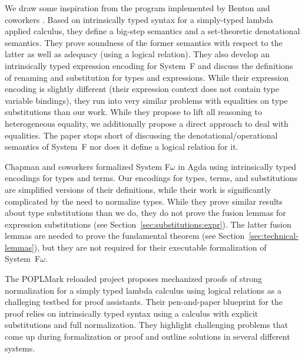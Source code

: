 \documentclass[acmsmall,anonymous,review,screen]{acmart}
\begin{document}
We draw some inspiration from the program implemented by Benton and coworkers
\cite{DBLP:journals/jar/BentonHKM12}. Based on intrinsically typed
syntax for a simply-typed lambda applied calculus, they define a
big-step semantics and a set-theoretic denotational semantics. They
prove soundness of the former semantics with respect to the latter as
well as adequacy (using a logical relation). They also develop an
intrinsically typed expression encoding for System~F and discuss the
definitions of renaming and substitution for types and expressions.
While their expression encoding is slightly different (their
expression context does not contain type variable bindings), they run
into very similar problems with equalities on type substitutions than
our work. While they propose to lift all reasoning to heterogeneous
equality, we additionally propose a direct approach to deal with
equalities. 
The paper stops short of discussing the denotational/operational
semantics of System~F nor does it define a logical relation for it.

Chapman and coworkers \cite{DBLP:conf/mpc/ChapmanKNW19} formalized
System F$\omega$ in Agda using intrinsically typed encodings for types
and terms. Our encodings for types, terms, and substitutions are
simplified versions of their definitions, while their work is
significantly complicated by the need to normalize types. While they
prove similar results about type substitutions than we do, they do not
prove the fusion lemmas for expression substitutions (see
Section~\ref{sec:substitutions:expr}). The latter fusion lemmas are needed to
prove the fundamental theorem (see
Section~\ref{sec:technical-lemmas}), but they are not required for
their executable formalization of System~F$\omega$.

The POPLMark reloaded project \cite{DBLP:journals/jfp/AbelAHPMSS19} proposes
mechanized proofs of strong normalization for a simply typed lambda
calculus using logical relations as a challeging testbed for proof
assistants. Their pen-and-paper blueprint for the proof relies on
intrinsically typed syntax using a calculus with explicit
substitutions and full normalization. They highlight challenging
problems that come up during formalization or proof and outline
solutions in several different systems. 
\end{document}
